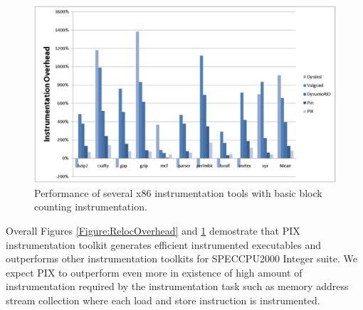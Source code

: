 \begin{figure}[ht]
\centering
\label{Figure:ToolOverheads}
\includegraphics[scale=0.5]{bbcount.eps}
\caption{Performance of several x86 instrumentation tools with basic block counting instrumentation.}
\end{figure}

Overall Figures \ref{Figure:RelocOverhead} and \ref{Figure:ToolOverheads} demostrate that PIX instrumentation 
toolkit generates efficient instrumented executables and
outperforms other instrumentation toolkits for SPECCPU2000 Integer suite. We expect PIX to outperform even more in 
existence of high amount of instrumentation required by the instrumentation task such as memory address stream collection
where each load and store instruction is instrumented.
